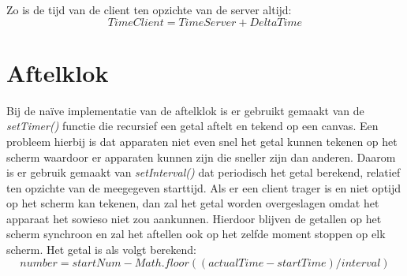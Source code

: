 \documentclass[a4paper,11pt]{article}
\begin{document}
  Zo is de tijd van de client ten opzichte van de server altijd:
  \[TimeClient = TimeServer + DeltaTime\]


  \section{Aftelklok}
  Bij de naïve implementatie van de aftelklok is er gebruikt gemaakt van de {\it setTimer()} functie die recursief een getal aftelt en tekend op een canvas. Een probleem hierbij is dat apparaten niet even snel het getal kunnen tekenen op het scherm waardoor er apparaten kunnen zijn die sneller zijn dan anderen.
  Daarom is er gebruik gemaakt van {\it setInterval()} dat periodisch het getal berekend, relatief ten opzichte van de meegegeven starttijd. Als er een client trager is en niet optijd op het scherm kan tekenen, dan zal het getal worden overgeslagen omdat het apparaat het sowieso niet zou aankunnen. Hierdoor blijven de getallen op het scherm synchroon en zal het aftellen ook op het zelfde moment stoppen op elk scherm.
  Het getal is als volgt berekend:
  \[number = startNum - Math.floor((actualTime - startTime) / interval)\]
\end{document}
